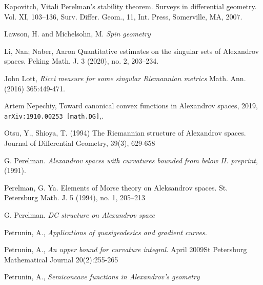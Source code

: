 \begin{thebibliography}{52}
 Kapovitch, Vitali Perelman's stability theorem. Surveys in differential geometry. Vol. XI, 103–136, Surv. Differ. Geom., 11, Int. Press, Somerville, MA, 2007.

Lawson, H. and Michelsohn, M.
\textit{Spin geometry}

Li, Nan; Naber, Aaron
Quantitative estimates on the singular sets of Alexandrov spaces. 
Peking Math. J. 3 (2020), no. 2, 203--234.

 John Lott,\textit{
Ricci measure for some singular Riemannian metrics}
Math. Ann. (2016) 365:449-471.

 Artem Nepechiy,
Toward canonical convex functions in Alexandrov spaces, 
2019,
\texttt{arXiv:1910.00253 [math.DG]},.

   Otsu, Y.,  Shioya, T. (1994)
The Riemannian structure of Alexandrov spaces. Journal of Differential Geometry, 39(3), 629-658

 G. Perelman. \textit{Alexandrov spaces with curvatures bounded from below II. preprint}, (1991).

Perelman, G. Ya.
Elements of Morse theory on Aleksandrov spaces.
St. Petersburg Math. J. 5 (1994), no. 1, 205–213 

 G. Perelman. \textit{DC structure on Alexandrov space}

 Petrunin, A., \textit{Applications of quasigeodesics
and gradient curves.}

 Petrunin, A., \textit{An upper bound for curvature integral.} April 2009St Petersburg Mathematical Journal 20(2):255-265

 Petrunin, A., \textit{Semiconcave functions in Alexandrov's geometry}

\end{thebibliography}

